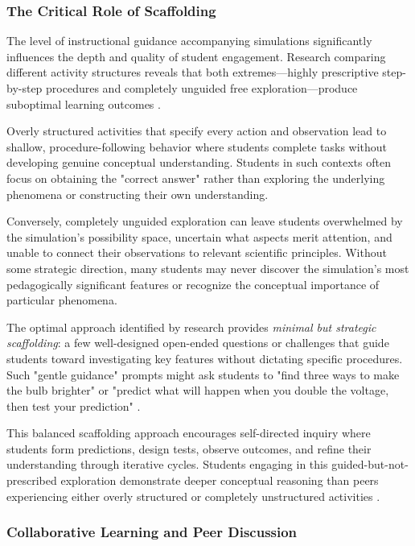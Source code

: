 \subsubsection{The Critical Role of Scaffolding}

The level of instructional guidance accompanying simulations significantly influences the depth and quality of student engagement. Research comparing different activity structures reveals that both extremes—highly prescriptive step-by-step procedures and completely unguided free exploration—produce suboptimal learning outcomes \cite{phet2023}.

Overly structured activities that specify every action and observation lead to shallow, procedure-following behavior where students complete tasks without developing genuine conceptual understanding. Students in such contexts often focus on obtaining the "correct answer" rather than exploring the underlying phenomena or constructing their own understanding.

Conversely, completely unguided exploration can leave students overwhelmed by the simulation's possibility space, uncertain what aspects merit attention, and unable to connect their observations to relevant scientific principles. Without some strategic direction, many students may never discover the simulation's most pedagogically significant features or recognize the conceptual importance of particular phenomena.

The optimal approach identified by research provides \textit{minimal but strategic scaffolding}: a few well-designed open-ended questions or challenges that guide students toward investigating key features without dictating specific procedures. Such "gentle guidance" prompts might ask students to "find three ways to make the bulb brighter" or "predict what will happen when you double the voltage, then test your prediction" \cite{phet2023}.

This balanced scaffolding approach encourages self-directed inquiry where students form predictions, design tests, observe outcomes, and refine their understanding through iterative cycles. Students engaging in this guided-but-not-prescribed exploration demonstrate deeper conceptual reasoning than peers experiencing either overly structured or completely unstructured activities \cite{phet2023}.

\subsubsection{Collaborative Learning and Peer Discussion}

